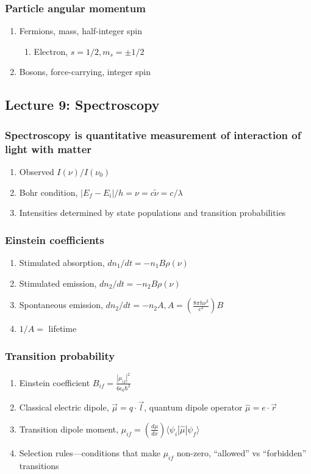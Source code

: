\documentclass[11pt]{article}
\begin{document}
\subsubsection{Particle angular momentum}
\label{sec:org0f8eeeb}
\begin{enumerate}
\item Fermions, mass, half-integer spin
\begin{enumerate}
\item Electron, \(s=1/2, m_s=\pm 1/2\)
\end{enumerate}
\item Bosons, force-carrying, integer spin
\end{enumerate}
\subsection{Lecture 9: Spectroscopy}
\label{sec:orgd2407a5}
\subsubsection{Spectroscopy is quantitative measurement of interaction of light with matter}
\label{sec:org3177b2a}
\begin{enumerate}
\item Observed \(I(\nu)/I(\nu_0)\)
\item Bohr condition, \(|E_f-E_i|/h=\nu =c\tilde{\nu}=c/\lambda\)
\item Intensities determined by state populations and transition probabilities
\end{enumerate}
\subsubsection{Einstein coefficients}
\label{sec:orgd7080aa}
\begin{enumerate}
\item Stimulated absorption, \(dn_1/dt= -n_1 B\rho(\nu)\)
\item Stimulated emission, \(dn_2/dt= -n_2 B\rho(\nu)\)
\item Spontaneous emission, \(dn_2/dt=-n_2 A, A=\left ( \frac{8\pi h
              \nu^3}{c^3}\right )B\)
\item \(1/A=\) lifetime
\end{enumerate}
\subsubsection{Transition probability}
\label{sec:org997937e}
\begin{enumerate}
\item Einstein coefficient \(B_{if}=\frac{|\mu_{if}|^2}{6\epsilon_0\hbar^2}\)
\item Classical electric dipole, \(\overrightarrow{\mu}=q \cdot
          \overrightarrow{l}\), quantum dipole operator \(\hat\mu = e\cdot \overrightarrow{r}\)
\item Transition dipole moment, \(\mu_{if} = \left(
        \frac{d\mu}{dx}\right ) \langle \psi_i|\hat\mu |\psi_f \rangle\)
\item Selection rules---conditions that make \(\mu_{if}\) non-zero,
``allowed'' vs ``forbidden'' transitions
\end{enumerate}
\end{document}
